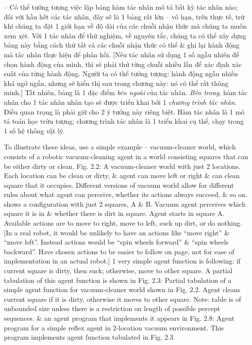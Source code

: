\documentclass{article}
\begin{document}
\begin{itemize}
\begin{itemize}
\begin{itemize}
			-- Có thể tưởng tượng việc lập bảng hàm tác nhân mô tả bất kỳ tác nhân nào; đối với hầu hết các tác nhân, đây sẽ là 1 bảng rất lớn -- vô hạn, trên thực tế, trừ khi chúng ta đặt 1 giới hạn về độ dài của các chuỗi nhận thức mà chúng ta muốn xem xét. Với 1 tác nhân để thử nghiệm, về nguyên tắc, chúng ta có thể xây dựng bảng này bằng cách thử tất cả các chuỗi nhận thức có thể \& ghi lại hành động mà tác nhân thực hiện để phản hồi. [Nếu tác nhân sử dụng 1 số ngẫu nhiên để chọn hành động của mình, thì sẽ phải thử từng chuỗi nhiều lần để xác định xác suất của từng hành động. Người ta có thể tưởng tượng: hành động ngẫu nhiên khá ngớ ngẩn, nhưng sẽ hiển thị sau trong chương này: nó có thể rất thông minh.] Tất nhiên, bảng là 1 đặc điểm {\it bên ngoài} của tác nhân. {\it Bên trong}, hàm tác nhân cho 1 tác nhân nhân tạo sẽ được triển khai bởi 1 {\it chương trình tác nhân}. Điều quan trọng là phải giữ cho 2 ý tưởng này riêng biệt. Hàm tác nhân là 1 mô tả toán học trừu tượng; chương trình tác nhân là 1 triển khai cụ thể, chạy trong 1 số hệ thống vật lý.
			
			To illustrate these ideas, use a simple example -- vacuum-cleaner world, which consists of a robotic vacuum-cleaning agent in a world consisting squares that can be either dirty or clean. {\sf Fig. 2.2: A vacuum-cleaner world with just 2 locations. Each location can be clean or dirty, \& agent can move left or right \& can clean square that it occupies. Different versions of vacuum world allow for different rules about what agent can perceive, whether its actions always succeed, \& so on.} shows a configuration with just 2 squares, A \& B. Vacuum agent perceives which square it is in \& whether there is dirt in square. Agent starts in square A. Available actions are to move to right, move to left, suck up dirt, or do nothing. [In a real robot, it would be unlikely to have an actions like ``move right'' \& ``move left''. Instead actions would be ``spin wheels forward'' \& ``spin wheels backward''. Have chosen actions to be easier to follow on page, not for ease of implementation in an actual robot.] 1 very simple agent function is following: if current square is dirty, then suck; otherwise, move to other square. A partial tabulation of this agent function is shown in {\sf Fig. 2.3: Partial tabulation of a simple agent function for vacuum-cleaner world shown in Fig. 2.2. Agent cleans current square if it is dirty, otherwise it moves to other square. Note: table is of unbounded size unless there is a restriction on length of possible percept sequences.} \& an agent program that implements it appears in {\sf Fig. 2.8: Agent program for a simple reflex agent in 2-location vacuum environment. This program implements agent function tabulated in Fig. 2.3.}
			

\end{itemize}
\end{itemize}
\end{itemize}
\end{document}

